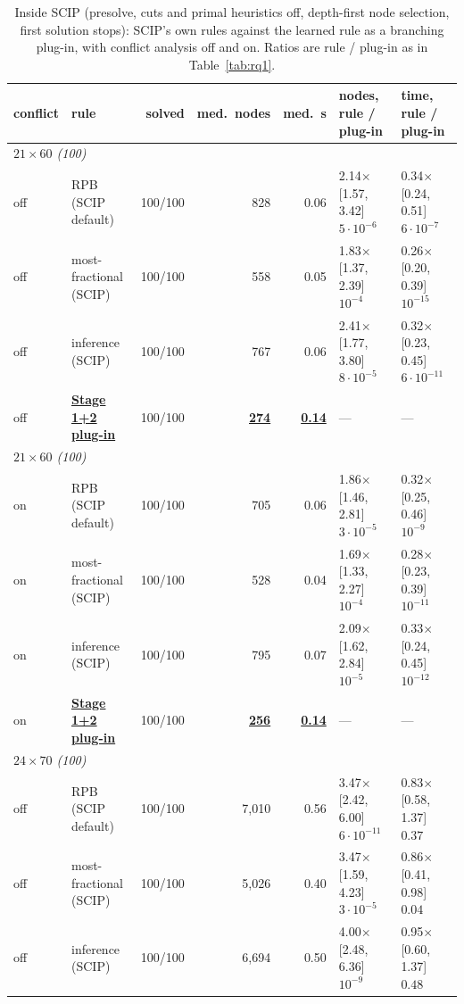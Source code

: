 \begin{table}[t]
\centering
\caption{Inside SCIP (presolve, cuts and primal heuristics off, depth-first node selection, first solution stops): SCIP's own rules against the learned rule as a branching plug-in, with conflict analysis off and on. Ratios are rule / plug-in as in Table~\ref{tab:rq1}.}
\label{tab:scip}
\footnotesize
\begin{tabular}{llrrrll}
\toprule
conflict & rule & solved & med.\ nodes & med.\ s & nodes, rule / plug-in & time, rule / plug-in \\
\midrule
\multicolumn{7}{l}{\emph{$21\times60$ (100)}} \\
off & RPB (SCIP default) & 100/100 & 828 & 0.06 & 2.14$\times$ [1.57, 3.42] $5\cdot10^{-6}$ & 0.34$\times$ [0.24, 0.51] $6\cdot10^{-7}$ \\
off & most-fractional (SCIP) & 100/100 & 558 & 0.05 & 1.83$\times$ [1.37, 2.39] $10^{-4}$ & 0.26$\times$ [0.20, 0.39] $10^{-15}$ \\
off & inference (SCIP) & 100/100 & 767 & 0.06 & 2.41$\times$ [1.77, 3.80] $8\cdot10^{-5}$ & 0.32$\times$ [0.23, 0.45] $6\cdot10^{-11}$ \\
off & \textbf{\underline{Stage 1+2 plug-in}} & 100/100 & \textbf{\underline{274}} & \textbf{\underline{0.14}} & --- & --- \\
\midrule
\multicolumn{7}{l}{\emph{$21\times60$ (100)}} \\
on & RPB (SCIP default) & 100/100 & 705 & 0.06 & 1.86$\times$ [1.46, 2.81] $3\cdot10^{-5}$ & 0.32$\times$ [0.25, 0.46] $10^{-9}$ \\
on & most-fractional (SCIP) & 100/100 & 528 & 0.04 & 1.69$\times$ [1.33, 2.27] $10^{-4}$ & 0.28$\times$ [0.23, 0.39] $10^{-11}$ \\
on & inference (SCIP) & 100/100 & 795 & 0.07 & 2.09$\times$ [1.62, 2.84] $10^{-5}$ & 0.33$\times$ [0.24, 0.45] $10^{-12}$ \\
on & \textbf{\underline{Stage 1+2 plug-in}} & 100/100 & \textbf{\underline{256}} & \textbf{\underline{0.14}} & --- & --- \\
\midrule
\multicolumn{7}{l}{\emph{$24\times70$ (100)}} \\
off & RPB (SCIP default) & 100/100 & 7,010 & 0.56 & 3.47$\times$ [2.42, 6.00] $6\cdot10^{-11}$ & 0.83$\times$ [0.58, 1.37] $0.37$ \\
off & most-fractional (SCIP) & 100/100 & 5,026 & 0.40 & 3.47$\times$ [1.59, 4.23] $3\cdot10^{-5}$ & 0.86$\times$ [0.41, 0.98] $0.04$ \\
off & inference (SCIP) & 100/100 & 6,694 & 0.50 & 4.00$\times$ [2.48, 6.36] $10^{-9}$ & 0.95$\times$ [0.60, 1.37] $0.48$ \\

\end{tabular}
\end{table}
